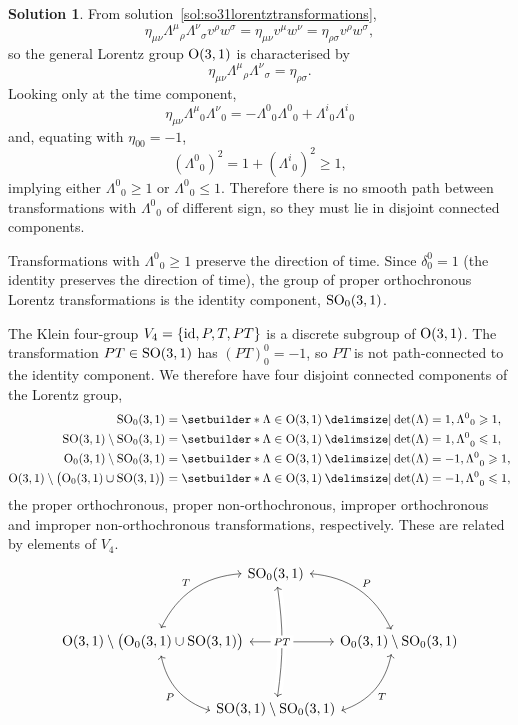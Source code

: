 \documentclass[11pt, a4paper]{report}
\theoremstyle{definition}
\newtheorem{solution}{Solution}[part]
\newenvironment{sol}{\begin{solution}}{\end{solution}\pagebreak[3]}
\renewcommand{\leq}{\leqslant}
\renewcommand{\geq}{\geqslant}
\renewcommand*{\O}{\ensuremath\text{O}}
\newcommand*{\SO}{\ensuremath\text{SO}}
\newcommand*{\id}{\ensuremath\mathop{}\mathopen{}\mathrm{id}}
\begin{document}
\begin{sol}

From solution~\ref{sol:so31lorentztransformations},
\[
    \eta_{\mu\nu} {\Lambda^\mu}_\rho {\Lambda^\nu}_\sigma v^\rho w^\sigma
        = \eta_{\mu\nu} v^\mu w^\nu
        = \eta_{\rho \sigma} v^\rho w^\sigma,
\]
so the general Lorentz group $\O(3, 1)$ is characterised by
\[
    \eta_{\mu\nu} {\Lambda^\mu}_\rho {\Lambda^\nu}_\sigma = \eta_{\rho\sigma}.
\]
Looking only at the time component,
\[
    \eta_{\mu\nu} {\Lambda^\mu}_0 {\Lambda^\nu}_0
        = -{\Lambda^0}_0 {\Lambda^0}_0 + {\Lambda^i}_0 {\Lambda^i}_0
\]
and, equating with $\eta_{00} = -1$,
\[
    {({\Lambda^0}_0)}^2 = 1 + {({\Lambda^i}_0)}^2 \geq 1,
\]
implying either ${\Lambda^0}_0 \geq 1$ or ${\Lambda^0}_0 \leq 1$.
Therefore there is no smooth path between transformations with ${\Lambda^0}_0$ of different sign, so they must lie in disjoint connected components.

Transformations with ${\Lambda^0}_0 \geq 1$ preserve the direction of time.
Since $\delta_0^0 = 1$ (the identity preserves the direction of time), the group of proper orthochronous Lorentz transformations is the identity component, $\SO_0(3, 1)$.

The Klein four-group $V_4 = \{\id, P, T, PT\}$ is a discrete subgroup of $\O(3, 1)$. The transformation $PT \in \SO(3, 1)$ has ${(PT)}^0_0 = -1$, so $PT$ is not path-connected to the identity component.
We therefore have four disjoint connected components of the Lorentz group,
\begin{align*}
    \SO_0(3, 1) &= \setbuilder*{\Lambda \in \O(3, 1) \given \det(\Lambda) = 1, {\Lambda^0}_0 \geq 1}, \\
    \SO(3, 1) \setminus \SO_0(3, 1)
        &= \setbuilder*{\Lambda \in \O(3, 1)  \given {\det(\Lambda) = 1, \Lambda^0}_0 \leq 1}, \\
    \O_0(3, 1) \setminus \SO_0(3, 1)
        &= \setbuilder*{\Lambda \in \O(3, 1)  \given {\det(\Lambda) = -1, \Lambda^0}_0 \geq 1}, \\
    \O(3, 1) \setminus \bigl( \O_0(3, 1) \cup \SO(3, 1) \bigr)
        &= \setbuilder*{\Lambda \in \O(3, 1)  \given {\det(\Lambda) = -1, \Lambda^0}_0 \leq 1},
\end{align*}
the proper orthochronous, proper non-orthochronous, improper orthochronous and improper non-orthochronous transformations, respectively.
These are related by elements of $V_4$.
\[
    \begin{tikzcd}[row sep=7ex, column sep={8.8em, between origins},
                   every arrow/.append style=leftrightarrow]
        & \SO_0(3, 1) \dlar[bend right=30, swap]{T}
                      \drar[bend left=30]{P} & \\
        \O(3, 1) \setminus \bigl( \O_0(3, 1) \cup \SO(3, 1) \bigr)
                \drar[bend right=30, swap]{P}
                \ar{rr}
            & & \O_0(3, 1) \setminus \SO_0(3, 1)
                \dlar[bend left=30]{T} \\
        & \SO(3, 1) \setminus \SO_0(3, 1) \ar[crossing over, bend right=8, labels=description]{uu}{PT} &
    \end{tikzcd}
\]

\end{sol}
\end{document}
